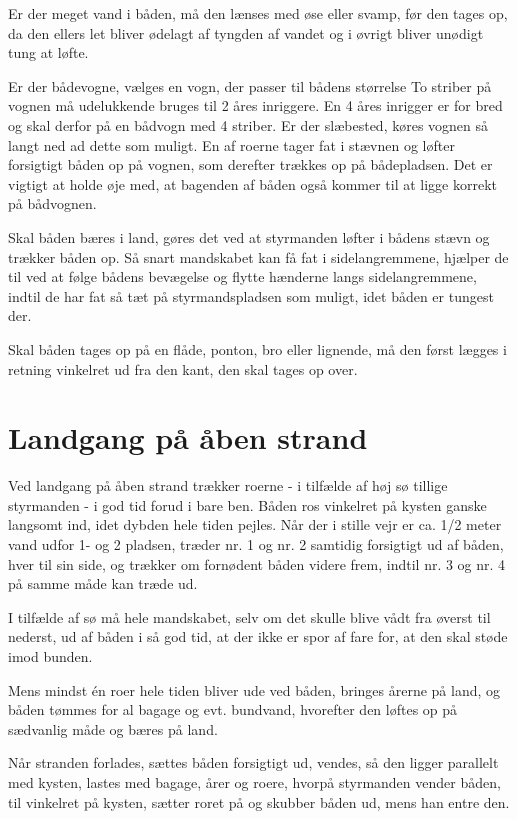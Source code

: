 \documentclass{article}
\begin{document}
Er der meget vand i båden, må den lænses med øse eller svamp, før den
tages op, da den ellers let bliver ødelagt af tyngden af vandet og i
øvrigt bliver unødigt tung at løfte.

Er der bådevogne, vælges en vogn, der passer til bådens størrelse To
striber på vognen må udelukkende bruges til 2 åres inriggere. En 4 åres
inrigger er for bred og skal derfor på en bådvogn med 4 striber. Er der
slæbested, køres vognen så langt ned ad dette som muligt. En af roerne
tager fat i stævnen og løfter forsigtigt båden op på vognen, som derefter
trækkes op på bådepladsen. Det er vigtigt at holde øje med, at bagenden
af båden også kommer til at ligge korrekt på bådvognen.

Skal båden bæres i land, gøres det ved at styrmanden løfter i bådens
stævn og trækker båden op. Så snart mandskabet kan få fat i
sidelangremmene, hjælper de til ved at følge bådens bevægelse og flytte
hænderne langs sidelangremmene, indtil de har fat så tæt på
styrmandspladsen som muligt, idet båden er tungest der.

Skal båden tages op på en flåde, ponton, bro eller lignende, må den først
lægges i retning vinkelret ud fra den kant, den skal tages op over.

\section{Landgang på åben strand}

Ved landgang på åben strand trækker roerne - i tilfælde af høj sø tillige
styrmanden - i god tid forud i bare ben. Båden ros vinkelret på kysten
ganske langsomt ind, idet dybden hele tiden pejles. Når der i stille vejr
er ca. 1/2 meter vand udfor 1- og 2 pladsen, træder nr. 1 og nr. 2
samtidig forsigtigt ud af båden, hver til sin side, og trækker om
fornødent båden videre frem, indtil nr. 3 og nr. 4 på samme måde kan
træde ud.

I tilfælde af sø må hele mandskabet, selv om det skulle blive vådt fra
øverst til nederst, ud af båden i så god tid, at der ikke er spor af fare
for, at den skal støde imod bunden.

Mens mindst én roer hele tiden bliver ude ved båden, bringes årerne på
land, og båden tømmes for al bagage og evt. bundvand, hvorefter den
løftes op på sædvanlig måde og bæres på land.

Når stranden forlades, sættes båden forsigtigt ud, vendes, så den ligger
parallelt med kysten, lastes med bagage, årer og roere, hvorpå styrmanden
vender båden, til vinkelret på kysten, sætter roret på og skubber båden
ud, mens han entre den.
\end{document}
